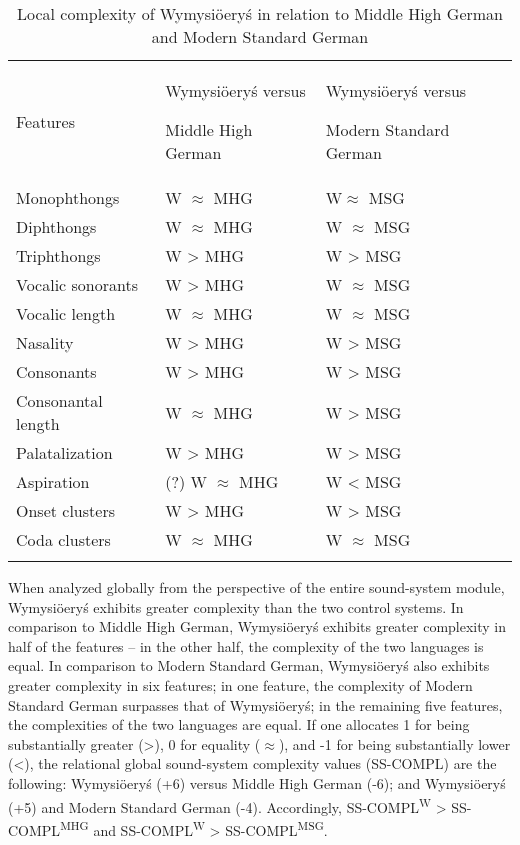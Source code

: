 \documentclass[output=paper]{langscibook}
\begin{document}
\begin{table}
\caption{Local complexity of Wymysiöeryś in relation to Middle High German and Modern Standard German}
\label{tab:Wymysiöeryś:1}
\begin{tabularx}{\textwidth}{XXX}

\lsptoprule

Features & Wymysiöeryś versus

Middle High German & Wymysiöeryś versus

Modern Standard German\\
Monophthongs & W ${\approx}$ MHG & W${\approx}$ MSG\\
Diphthongs & W ${\approx}$ MHG & W ${\approx}$ MSG\\
Triphthongs & W > MHG & W > MSG\\
Vocalic sonorants & W > MHG & W ${\approx}$ MSG\\
Vocalic length & W ${\approx}$ MHG & W ${\approx}$ MSG\\
Nasality & W > MHG & W > MSG\\
Consonants & W > MHG & W > MSG\\
Consonantal length & W ${\approx}$ MHG & W > MSG\\
Palatalization & W > MHG & W > MSG\\
Aspiration & (?) W ${\approx}$ MHG & W < MSG\\
Onset clusters & W > MHG & W > MSG\\
Coda clusters & W ${\approx}$ MHG & W ${\approx}$ MSG\\
\lspbottomrule
\end{tabularx}
\end{table}

When analyzed globally from the perspective of the entire sound-system module, Wymysiöeryś exhibits greater complexity than the two control systems. In comparison to Middle High German, Wymysiöeryś exhibits greater complexity in half of the features – in the other half, the complexity of the two languages is equal. In comparison to Modern Standard German, Wymysiöeryś also exhibits greater complexity in six features; in one feature, the complexity of Modern Standard German surpasses that of Wymysiöeryś; in the remaining five features, the complexities of the two languages are equal. If one allocates 1 for being substantially greater (>), 0 for equality (${\approx}$), and -1 for being substantially lower (<), the relational global sound-system complexity values (SS-COMPL) are the following: Wymysiöeryś (+6) versus Middle High German (-6); and Wymysiöeryś (+5) and Modern Standard German (-4). Accordingly, SS-COMPL\textsuperscript{W} > SS-COMPL\textsuperscript{MHG} and SS-COMPL\textsuperscript{W} > SS-COMPL\textsuperscript{MSG}. 
\end{document}
